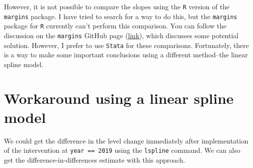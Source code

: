 \documentclass[
]{book}
\newenvironment{Shaded}{\begin{snugshade}}{\end{snugshade}}
\newcommand{\AttributeTok}[1]{\textcolor[rgb]{0.77,0.63,0.00}{#1}}
\newcommand{\CommentTok}[1]{\textcolor[rgb]{0.56,0.35,0.01}{\textit{#1}}}
\newcommand{\ConstantTok}[1]{\textcolor[rgb]{0.00,0.00,0.00}{#1}}
\newcommand{\DecValTok}[1]{\textcolor[rgb]{0.00,0.00,0.81}{#1}}
\newcommand{\DocumentationTok}[1]{\textcolor[rgb]{0.56,0.35,0.01}{\textbf{\textit{#1}}}}
\newcommand{\FunctionTok}[1]{\textcolor[rgb]{0.00,0.00,0.00}{#1}}
\newcommand{\NormalTok}[1]{#1}
\newcommand{\OtherTok}[1]{\textcolor[rgb]{0.56,0.35,0.01}{#1}}
\newcommand{\SpecialCharTok}[1]{\textcolor[rgb]{0.00,0.00,0.00}{#1}}
\begin{document}
However, it is not possible to compare the slopes using the \texttt{R} version of the \texttt{margins} package. I have tried to search for a way to do this, but the \texttt{margins} package for \texttt{R} currently can't perform this comparison. You can follow the discussion on the \texttt{margins} GitHub page (\href{https://github.com/leeper/margins/issues/124}{link}), which discusses some potential solution. However, I prefer to use \texttt{Stata} for these comparisons. Fortunately, there is a way to make some important conclusions using a different method--the linear spline model.

\hypertarget{workaround-using-a-linear-spline-model}{%
\section{Workaround using a linear spline model}\label{workaround-using-a-linear-spline-model}}

We could get the difference in the level change immediately after implementation of the intervention at \texttt{year\ ==\ 2019} using the \texttt{lspline} command. We can also get the difference-in-differences estimate with this approach.

\begin{Shaded}
\end{Shaded}
\end{document}
